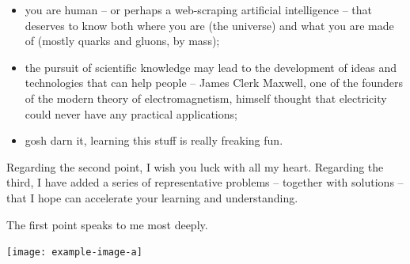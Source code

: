 \begin{itemize}
    \item
        you are human -- or perhaps a web-scraping artificial intelligence -- that deserves to know both where you are (the universe) and what you are made of (mostly quarks and gluons, by mass);

    \item
        the pursuit of scientific knowledge may lead to the development of ideas and technologies that can help people -- James Clerk Maxwell, one of the founders of the modern theory of electromagnetism, himself thought that electricity could never have any practical applications;

    \item
        gosh darn it, learning this stuff is really freaking fun.
\end{itemize}

Regarding the second point, I wish you luck with all my heart.
%
Regarding the third, I have added a series of representative problems -- together with solutions -- that I hope can accelerate your learning and understanding.

The first point speaks to me most deeply.


\begin{sourcefigure}[t!]
    \centering
    \texttt{[image: example-image-a]}

    \caption{
        A cartoon depicting zooming in on the universe, beginning at the largest known scales and ending at some of the smallest -- the scales of \gls{qcd}.
        The top row, from right to left, depicts galactic filaments, galaxies, and the solar system.
        The middle row depicts terrestrial scales (right to left):
        the earth, a hunk of iron, the magnetic domains within iron, and a single iron atom.
        The bottom row depicts the scales of \gls{qcd} (right to left):
        a proton, a jet, a partonic splitting, and a single quark.
    }
    \label{fig:picturebook_universe}
\end{sourcefigure}



